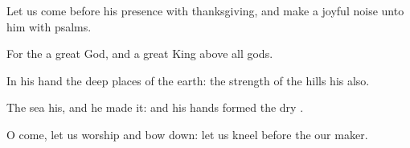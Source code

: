 {\par }{\Q {}Let us
come before his
presence with
thanksgiving, and make a joyful
noise unto him with
psalms.


\par }{\Q {}For the
{}
{} a
great
God, and a
great
King above all
gods.


\par }{\Q {}In his
hand
{} the deep
places of the
earth: the
strength of the
hills
{} his also.


\par }{\Q {}The
sea
{} his, and he
made it: and his
hands
formed the
dry
{}.


\par }{\Q {}O
come, let us
worship and bow
down: let us
kneel
before the
{} our
maker.


\par }{\BB \par }
